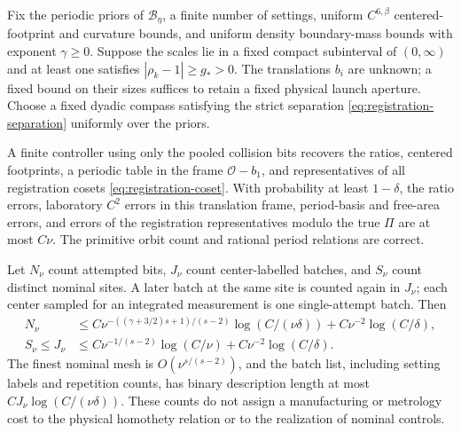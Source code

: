 \begin{theorem}
\label{thm:registration-finite}
Fix the periodic priors of $\mathcal B_\eta$, a finite number of
settings, uniform $C^{6,\beta}$ centered-footprint and curvature
bounds, and uniform density boundary-mass bounds with exponent
$\gamma\ge0$. Suppose the scales lie in a fixed compact subinterval
of $(0,\infty)$ and at least one satisfies $|\rho_k-1|\ge g_*>0$.
The translations $b_i$ are unknown; a fixed bound on their sizes
suffices to retain a fixed physical launch aperture. Choose a fixed
dyadic compass satisfying the strict separation
\eqref{eq:registration-separation} uniformly over the priors.

A finite controller using only the pooled collision bits recovers
the ratios, centered footprints, a periodic table in the frame
$\mathcal O-b_1$, and representatives of all registration cosets
\eqref{eq:registration-coset}. With probability at least $1-\delta$,
the ratio errors, laboratory $C^2$ errors in this translation frame,
period-basis and free-area errors, and errors of the registration
representatives modulo the true $\Pi$ are at most $C\nu$.
The primitive orbit count and rational period relations are correct.

Let $N_\nu$ count attempted bits, $J_\nu$ count center-labelled
batches, and $S_\nu$ count distinct nominal sites. A later batch at
the same site is counted again in $J_\nu$; each center sampled for
an integrated measurement is one single-attempt batch. Then
\begin{align}
 N_\nu&\le C\nu^{-((\gamma+3/2)s+1)/(s-2)}
           \log(C/(\nu\delta))
           +C\nu^{-2}\log(C/\delta),
                                    \label{eq:registration-attempts}\\
 S_\nu\le J_\nu&\le
       C\nu^{-1/(s-2)}\log(C/\nu)
                  +C\nu^{-2}\log(C/\delta).
                                    \label{eq:registration-batches}
\end{align}
The finest nominal mesh is $O(\nu^{s/(s-2)})$, and the batch list,
including setting labels and repetition counts, has binary
description length at most $C J_\nu\log(C/(\nu\delta))$.
These counts do not assign a manufacturing or metrology cost to the
physical homothety relation or to the realization of nominal controls.
\end{theorem}
